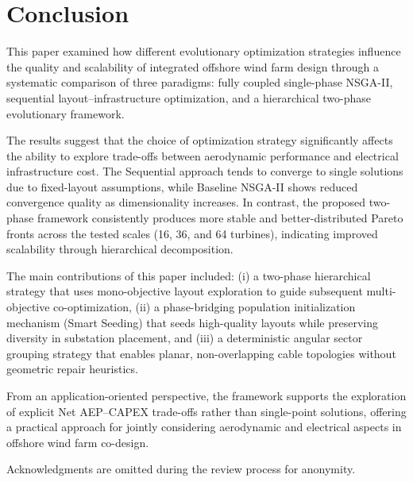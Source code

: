 \documentclass[format=sigconf,anonymous=true,review=true]{acmart}
\begin{document}
%
\section{Conclusion}

This paper examined how different evolutionary optimization strategies influence the quality and scalability of integrated offshore wind farm design through a systematic comparison of three paradigms: fully coupled single-phase NSGA-II, sequential layout–infrastructure optimization, and a hierarchical two-phase evolutionary framework.

The results suggest that the choice of optimization strategy significantly affects the ability to explore trade-offs between aerodynamic performance and electrical infrastructure cost. The Sequential approach tends to converge to single solutions due to fixed-layout assumptions, while Baseline NSGA-II shows reduced convergence quality as dimensionality increases. In contrast, the proposed two-phase framework consistently produces more stable and better-distributed Pareto fronts across the tested scales (16, 36, and 64 turbines), indicating improved scalability through hierarchical decomposition.

The main contributions of this paper included: (i) a two-phase hierarchical strategy that uses mono-objective layout exploration to guide subsequent multi-objective co-optimization, (ii) a phase-bridging population initialization mechanism (Smart Seeding) that seeds high-quality layouts while preserving diversity in substation placement, and (iii) a deterministic angular sector grouping strategy that enables planar, non-overlapping cable topologies without geometric repair heuristics.

From an application-oriented perspective, the framework supports the exploration of explicit Net AEP–CAPEX trade-offs rather than single-point solutions, offering a practical approach for jointly considering aerodynamic and electrical aspects in offshore wind farm co-design.

\begin{acks}
Acknowledgments are omitted during the review process for anonymity.
\end{acks}

\clearpage

 
\end{document}
